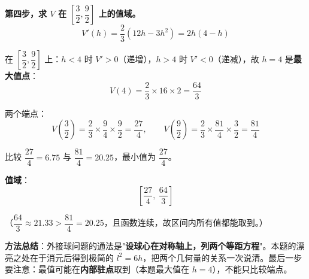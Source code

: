 \begin{answer}
\textbf{第四步，求 $V$ 在 $\left[\dfrac32,\dfrac92\right]$ 上的值域。}
\nopagebreak[4]
\[V'(h)=\frac23\left(12h-3h^{2}\right)=2h(4-h)\]

在 $\left[\dfrac32,\dfrac92\right]$ 上：$h<4$ 时 $V'>0$（递增），$h>4$ 时 $V'<0$（递减），故 $h=4$ 是\textbf{最大值点}：
\nopagebreak[4]
\[V(4)=\frac23\times16\times2=\frac{64}3\]

两个端点：
\nopagebreak[4]
\[V\left(\frac32\right)=\frac23\times\frac94\times\frac92=\frac{27}4,\qquad V\left(\frac92\right)=\frac23\times\frac{81}4\times\frac32=\frac{81}4\]

比较 $\dfrac{27}4=6.75$ 与 $\dfrac{81}4=20.25$，最小值为 $\dfrac{27}4$。

\textbf{值域}：
\nopagebreak[4]
\[\left[\frac{27}4,\ \frac{64}3\right]\]

（$\dfrac{64}3\approx21.33>\dfrac{81}4=20.25$，且函数连续，故区间内所有值都能取到。）

\begin{gktip}
\textbf{方法总结}：外接球问题的通法是"\textbf{设球心在对称轴上，列两个等距方程}"。本题的漂亮之处在于消元后得到极简的 $l^2=6h$，把两个几何量的关系一次说清。最后一步要注意：最值可能在\textbf{内部驻点}取到（本题最大值在 $h=4$），不能只比较端点。
\end{gktip}


\par\medskip

\end{answer}

